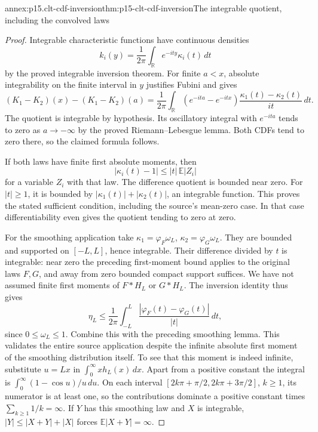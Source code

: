 \begin{annexitem}{annex:p15.clt-cdf-inversion}{thm:p15-clt-cdf-inversion}{The integrable quotient, including the convolved laws}
\begin{proof}
Integrable characteristic functions have continuous densities
\[
 k_i(y)=\frac1{2\pi}\int_{\mathbb R}e^{-ity}\kappa_i(t)\,dt
 \]
by the proved integrable inversion theorem.
For finite \(a<x\), absolute integrability on the finite
interval in \(y\) justifies Fubini and gives
\[
 (K_1-K_2)(x)-(K_1-K_2)(a)
 =\frac1{2\pi}\int_{\mathbb R}
   (e^{-ita}-e^{-itx})\frac{\kappa_1(t)-\kappa_2(t)}{it}\,dt.
 \]
The quotient is integrable by hypothesis. Its oscillatory integral
with \(e^{-ita}\) tends to zero as \(a\to-\infty\) by the
proved Riemann--Lebesgue lemma. Both CDFs tend to zero there,
so the claimed formula follows.

If both laws have finite first absolute moments, then
\[
 |\kappa_i(t)-1|\leq |t|\,\mathbb E|Z_i|
 \]
for a variable \(Z_i\) with that law. The difference quotient
is bounded near zero. For \(|t|\geq1\), it is bounded by
\(|\kappa_1(t)|+|\kappa_2(t)|\), an integrable function.
This proves the stated sufficient condition, including the
source's mean-zero case. In that case differentiability even
gives the quotient tending to zero at zero.

For the smoothing application take
\(\kappa_1=\varphi_F\omega_L\),
\(\kappa_2=\varphi_G\omega_L\).
They are bounded and supported on \([-L,L]\), hence integrable.
Their difference divided by \(t\) is integrable: near zero
the preceding first-moment bound applies to the original laws
\(F,G\), and away from zero bounded compact support suffices.
We have not assumed finite first moments of \(F*H_L\) or
\(G*H_L\). The inversion identity thus gives
\[
 \eta_L\leq\frac1{2\pi}\int_{-L}^L
          \frac{|\varphi_F(t)-\varphi_G(t)|}{|t|}\,dt,
 \]
since \(0\leq\omega_L\leq1\).
Combine this with the preceding smoothing lemma. This validates
the entire source application despite the infinite absolute first
moment of the smoothing distribution itself. To see that this
moment is indeed infinite, substitute \(u=Lx\) in
\(\int_0^\infty xh_L(x)\,dx\). Apart from a positive constant
the integral is \(\int_0^\infty(1-\cos u)/u\,du\).
On each interval
\([2k\pi+\pi/2,2k\pi+3\pi/2]\), \(k\geq1\), its numerator
is at least one, so the contributions dominate a positive
constant times \(\sum_{k\geq1}1/k=\infty\).
If \(Y\) has this smoothing law and \(X\) is integrable,
\(|Y|\leq|X+Y|+|X|\) forces \(\mathbb E|X+Y|=\infty\).
\end{proof}
\end{annexitem}

